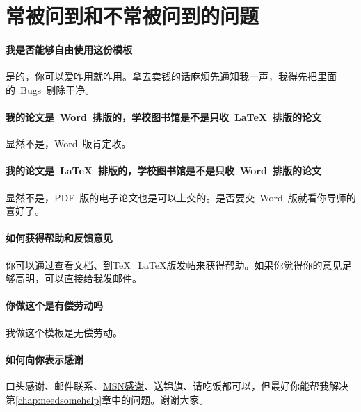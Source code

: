 
\chapter{常被问到和不常被问到的问题}
\label{chap:faq}

\subsubsection*{我是否能够自由使用这份模板}
是的，你可以爱咋用就咋用。拿去卖钱的话麻烦先通知我一声，我得先把里面的~Bugs~剔除干净。

\subsubsection*{我的论文是~Word~排版的，学校图书馆是不是只收~\LaTeX~排版的论文}
显然不是，Word~版肯定收。

\subsubsection*{我的论文是~\LaTeX~排版的，学校图书馆是不是只收~Word~排版的论文}
显然不是，PDF~版的电子论文也是可以上交的。是否要交~Word~版就看你导师的喜好了。

\subsubsection*{如何获得帮助和反馈意见}
你可以通过查看文档、到TeX\_LaTeX版发帖来获得帮助。如果你觉得你的意见足够高明，可以直接给我\href{mail:wei.jianwen@gmail.com}{发邮件}。

\subsubsection*{你做这个是有偿劳动吗}
我做这个模板是无偿劳动。

\subsubsection*{如何向你表示感谢}
口头感谢、邮件联系、\href{wei.jianwen@gmail.com}{MSN感谢}、送锦旗、请吃饭都可以，但最好你能帮我解决第\ref{chap:needsomehelp}章中的问题。谢谢大家。

